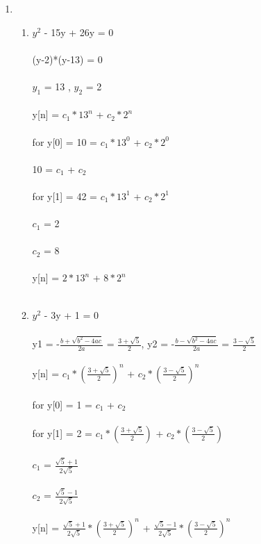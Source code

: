 \documentclass[10pt,a4paper, margin=1in]{article}
\begin{document}
\begin{enumerate}
\item 
    \begin{enumerate}
    \item %
        $y^{2}$ - 15y + 26y = 0\\\\
        (y-2)*(y-13) = 0\\\\
        $y_{1}$ = 13 , $y_{2}$ = 2\\\\
        y[n] = $c_{1}* 13^n$ +  $c_{2}* 2^n$\\\\
        for y[0] = 10 = $c_{1}* 13^0$ +  $c_{2}* 2^0$ \\\\
        10 = $c_{1}$ +  $c_{2}$ \\\\
        for y[1] = 42 = $c_{1}* 13^1$ +  $c_{2}* 2^1$ \\\\
        $c_{1}$ = 2\\\\
        $c_{2}$ = 8\\\\
        y[n] = $2* 13^n$ +  $8* 2^n$\\\\
        
    \item %
        $y^{2}$ - 3y + 1 = 0\\\\
        y1 = -$\frac{b+\sqrt{b^{2}-4ac}}{2a}$ = $\frac{3+\sqrt{5}}{2}$, \hspace{0.5cm}  y2 = -$\frac{b-\sqrt{b^{2}-4ac}}{2a}$ = $\frac{3-\sqrt{5}}{2}$\\\\
        y[n] = $c_{1}*(\frac{3+\sqrt{5}}{2})^{n}$ +  $c_{2}* (\frac{3-\sqrt{5}}{2})^{n}$\\\\
        for y[0] = 1 = $c_{1} $ +  $c_{2}$ \\\\
        for y[1] = 2 = $c_{1}* (\frac{3+\sqrt{5}}{2})$ +  $c_{2}* (\frac{3-\sqrt{5}}{2})$ \\\\
        $c_{1}$ = $\frac{\sqrt{5}+1}{2\sqrt{5}}$\\\\
        $c_{2}$ = $\frac{\sqrt{5}-1}{2\sqrt{5}}$\\\\
        y[n] = $\frac{\sqrt{5}+1}{2\sqrt{5}}* (\frac{3+\sqrt{5}}{2})^{n}$ +  $\frac{\sqrt{5}-1}{2\sqrt{5}}* (\frac{3-\sqrt{5}}{2})^{n}$\\\\
        

\end{enumerate}
\end{enumerate}
\end{document}
